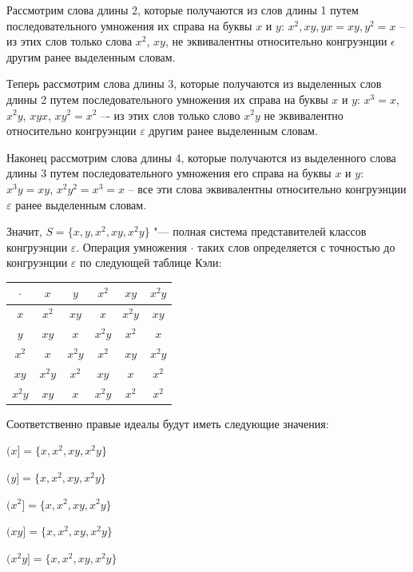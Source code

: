 \documentclass[bachelor, och, labwork]{shiza}
\begin{document}
    Рассмотрим слова длины 2, которые получаются из слов
    длины 1 путем последовательного умножения их справа на буквы $x$ и $y$: $x^2, xy, yx = xy, y^2 = x$ -- из этих 
    слов только слова $x^2$, $xy$, не эквивалентны относительно конгруэнции $\epsilon$ другим ранее выделенным словам.

    Теперь рассмотрим слова длины 3, которые получаются из выделенных слов длины 2 путем последовательного
    умножения их справа на буквы $x$ и $y$: $x^3 = x$, $x^2y$, $xyx$,  $xy^2 = x^2$  –- из этих слов только
    слово $x^2y$ не эквивалентно относительно конгруэнции $\varepsilon$ другим ранее выделенным словам.

    Наконец рассмотрим слова длины 4, которые получаются из выделенного слова длины 3 путем последовательного
    умножения его справа на буквы $x$ и $y$: $x^3y = xy$, $x^2y^2 = x^3 = x$ -- все эти слова эквивалентны
    относительно конгруэнции $\varepsilon$ ранее выделенным словам.

        Значит, $S = \{x, y, x^2, xy, x^2y \}$ "--- полная система представителей классов конгруэнции $\varepsilon$.
        Операция умножения $\cdot$ таких слов определяется с точностью до конгруэнции $\varepsilon$ по следующей таблице
        Кэли:

     \begin{table}[H]
          \centering
          \begin{tabular}{|c|c|c|c|c|c|}
          \hline
          $\cdot $ & $x$ & $y$  & $x^2$  & $xy$ & $x^2y$ \\ \hline
          $x$      & $x^2$ & $xy$ & $x$  & $x^2y$ & $xy$ \\ \hline
          $y$      & $xy$ & $x$ & $x^2y$ & $x^2$ & $x$ \\ \hline
          $x^2$     & $x$ & $x^2y$ & $x^2$ & $xy$ & $x^2y$ \\ \hline
          $xy$    & $x^2y$ & $x^2$ & $xy$ & $x$ & $x^2$ \\ \hline
          $x^2y$   & $xy$ &  $x$  &  $x^2y$ & $x^2$ & $x^2$ \\ \hline
          \end{tabular}
        \end{table}

      Соответственно правые идеалы будут иметь следующие значения:

      \begin{center}

        $(x] = \{x, x^2, xy, x^2y\}$

        $(y] = \{x, x^2, xy, x^2y\}$
  
        $(x^2] = \{x, x^2, xy, x^2y\}$
  
        $(xy] = \{x, x^2, xy, x^2y\}$
    
        $(x^2y] = \{x, x^2, xy, x^2y\}$

      \end{center}
\end{document}
